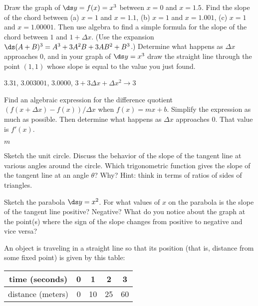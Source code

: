 \begin{enumialphparenastyle}
\begin{ex}
Draw the graph of $\ds y=f(x)=x^3$ between $x=0$ and $x=1.5$.  Find the slope
of the chord between (a) $x=1$ and $x=1.1$, (b) $x=1$ and $x=1.001$, (c)
$x=1$ and $x=1.00001$.  Then use algebra to find a simple formula for the
slope of the chord between $1$ and $1+\Delta x$.  (Use the expansion
$\ds (A+B)^3=A^3+3A^2B+3AB^2+B^3$.)  Determine what happens as $\Delta x$
approaches 0, and in your graph of $\ds y=x^3$ draw the straight line through
the point $(1,1)$ whose slope is equal to the value you just found.
\begin{sol}
$3.31$, $3.003001$, $3.0000$,\hfill\break
 $3+3\Delta x+\Delta x^2\rightarrow3$
\end{sol}
\end{ex}

\begin{ex}\label{ex:derivative of a line}
Find an algebraic expression for the difference quotient $(f(x+\Delta
x)-f(x))/\Delta x$ when $f(x)=mx+b$.  Simplify the expression as
much as possible.  Then determine what happens as $\Delta x$ approaches 0.
That value is $f'(x)$.
\begin{sol}
$m$
\end{sol}
\end{ex}


\begin{ex}
Sketch the unit circle.  Discuss the behavior of the slope
of the tangent line at various angles around the circle.  Which
trigonometric function gives the slope of the tangent line at an angle
$\theta$?  Why? Hint: think in terms of ratios of sides of triangles.
\end{ex}

\begin{ex}
Sketch the parabola $\ds y=x^2$.  For what values of $x$ on the parabola
is the slope of the tangent line positive?  Negative?  What do you notice
about the graph at the point(s) where the sign of the slope changes from
positive to negative and vice versa?
\end{ex}

\begin{ex}
An object is traveling in a straight line so that its position (that
is, distance from some fixed point) is
given by this table:
\begin{table}[!ht]
\begin{tabular}{|c|c|c|c|c|}
\hline
time (seconds)& 0& 1& 2& 3\\
\hline
distance (meters)& 0& 10& 25& 60\\
\hline
\end{tabular}
\end{table}


\end{ex}
\end{enumialphparenastyle}
